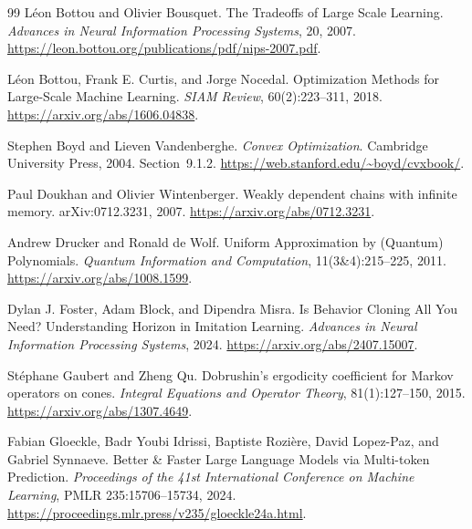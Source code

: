 \documentclass[11pt,twoside]{article}
\theoremstyle{definition}
\theoremstyle{remark}
\begin{document}
\clearpage
\begin{thebibliography}{99}
L\'eon Bottou and Olivier Bousquet.
\newblock The Tradeoffs of Large Scale Learning.
\newblock \emph{Advances in Neural Information Processing Systems}, 20, 2007.
\newblock \url{https://leon.bottou.org/publications/pdf/nips-2007.pdf}.

L\'eon Bottou, Frank E. Curtis, and Jorge Nocedal.
\newblock Optimization Methods for Large-Scale Machine Learning.
\newblock \emph{SIAM Review}, 60(2):223--311, 2018.
\newblock \url{https://arxiv.org/abs/1606.04838}.

Stephen Boyd and Lieven Vandenberghe.
\newblock \emph{Convex Optimization}.
\newblock Cambridge University Press, 2004. Section~9.1.2.
\newblock \url{https://web.stanford.edu/~boyd/cvxbook/}.

Paul Doukhan and Olivier Wintenberger.
\newblock Weakly dependent chains with infinite memory.
\newblock arXiv:0712.3231, 2007.
\newblock \url{https://arxiv.org/abs/0712.3231}.

Andrew Drucker and Ronald de Wolf.
\newblock Uniform Approximation by (Quantum) Polynomials.
\newblock \emph{Quantum Information and Computation},
11(3\&4):215--225, 2011.
\newblock \url{https://arxiv.org/abs/1008.1599}.

Dylan J. Foster, Adam Block, and Dipendra Misra.
\newblock Is Behavior Cloning All You Need? Understanding Horizon
in Imitation Learning.
\newblock \emph{Advances in Neural Information Processing Systems}, 2024.
\newblock \url{https://arxiv.org/abs/2407.15007}.

St\'ephane Gaubert and Zheng Qu.
\newblock Dobrushin's ergodicity coefficient for Markov operators on cones.
\newblock \emph{Integral Equations and Operator Theory}, 81(1):127--150, 2015.
\newblock \url{https://arxiv.org/abs/1307.4649}.

Fabian Gloeckle, Badr Youbi Idrissi, Baptiste Rozi\`ere,
David Lopez-Paz, and Gabriel Synnaeve.
\newblock Better \& Faster Large Language Models via Multi-token Prediction.
\newblock \emph{Proceedings of the 41st International Conference on Machine
Learning}, PMLR 235:15706--15734, 2024.
\newblock \url{https://proceedings.mlr.press/v235/gloeckle24a.html}.


\end{thebibliography}
\end{document}
